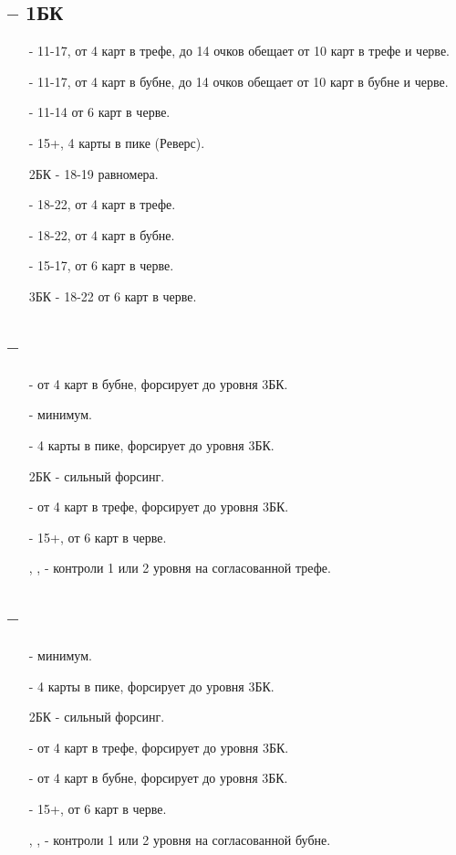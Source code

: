 \documentclass{article}
\begin{document}
\subsection{ -- 1БК}
\begin{enumerate}
    \item[\cl{2}] - 11-17, от 4 карт в трефе, до 14 очков обещает от 10 карт в трефе и черве. 
    \item[\di{2}] - 11-17, от 4 карт в бубне, до 14 очков обещает от 10 карт в бубне и черве. 
    \item[\he{2}] - 11-14 от 6 карт в черве.
    \item[\sp{2}] - 15+, 4 карты в пике (Реверс).
    \item[2БК] - 18-19 равномера.
    \item[\cl{3}] - 18-22, от 4 карт в трефе.
    \item[\di{3}] - 18-22, от 4 карт в бубне.
    \item[\he{3}] - 15-17, от 6 карт в черве.
    \item[3БК] - 18-22 от 6 карт в черве.
\end{enumerate}
\subsection{ -- }
\begin{enumerate} 
    \item[\di{2}] - от 4 карт в бубне, форсирует до уровня 3БК.
    \item[\he{2}] - минимум.
    \item[\sp{2}] - 4 карты в пике, форсирует до уровня 3БК.
    \item[2БК] - сильный форсинг.
    \item[\cl{3}] - от 4 карт в трефе, форсирует до уровня 3БК.
    \item[\he{3}] - 15+, от 6 карт в черве.
    \item[\sp{3}, \di{4}, \he{4}] - контроли 1 или 2 уровня на согласованной трефе.
\end{enumerate}
\subsection{ -- }
\begin{enumerate} 
    \item[\he{2}] - минимум.
    \item[\sp{2}] - 4 карты в пике, форсирует до уровня 3БК.
    \item[2БК] - сильный форсинг.
    \item[\cl{3}] - от 4 карт в трефе, форсирует до уровня 3БК.
    \item[\di{3}] - от 4 карт в бубне, форсирует до уровня 3БК.
    \item[\he{3}] - 15+, от 6 карт в черве.
    \item[\sp{3}, \cl{4}, \he{4}] - контроли 1 или 2 уровня на согласованной бубне.
\end{enumerate}
\end{document}
